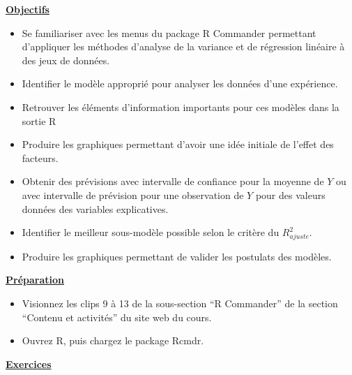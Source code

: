 \documentclass[12pt]{article}
\begin{document}
\vspace*{1mm}
\centerline{}
\vspace*{3.5mm}

\underline{\bf Objectifs} 

\begin{itemize}
\item Se familiariser avec les menus du package R Commander permettant d'appliquer les méthodes d'analyse de la variance et de régression linéaire à des jeux de données.
\item Identifier le modèle approprié pour analyser les données d'une expérience.
\item Retrouver les éléments d'information importants pour ces modèles dans la sortie R
\item Produire les graphiques permettant d'avoir une idée initiale de l'effet des facteurs.
\item Obtenir des prévisions avec intervalle de confiance pour la moyenne de $Y$ ou avec intervalle de prévision pour une observation de $Y$ pour des valeurs données des variables explicatives.
\item Identifier le meilleur sous-modèle possible selon le critère du $R^2_{ajuste}$.
\item Produire les graphiques permettant de valider les postulats des modèles.
\end{itemize}
\vspace{3mm}

\underline{\bf Préparation}
\medskip
\begin{itemize}
\item Visionnez les clips 9 à 13 de la sous-section ``R Commander'' de la section ``Contenu et activités'' du site web du cours.
\item Ouvrez R, puis chargez le package Rcmdr.
\end{itemize}
\vspace{3mm}


\underline{\bf Exercices}

\end{document}
